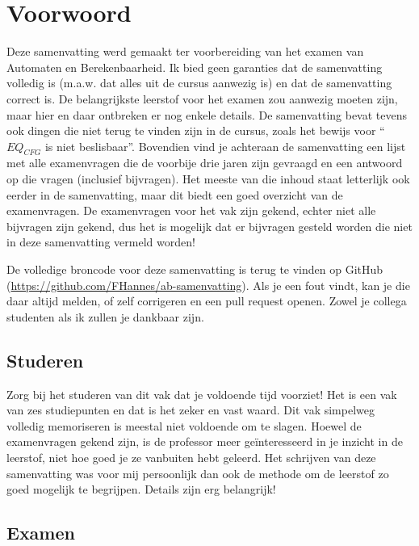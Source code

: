 \documentclass[a4paper]{article}
\begin{document}
\tableofcontents

\newpage

\section{Voorwoord}

Deze samenvatting werd gemaakt ter voorbereiding van het examen van Automaten en Berekenbaarheid. Ik bied geen garanties dat de samenvatting volledig is (m.a.w. dat alles uit de cursus aanwezig is) en dat de samenvatting correct is. De belangrijkste leerstof voor het examen zou aanwezig moeten zijn, maar hier en daar ontbreken er nog enkele details. De samenvatting bevat tevens ook dingen die niet terug te vinden zijn in de cursus, zoals het bewijs voor ``$EQ_{CFG}$ is niet beslisbaar''. Bovendien vind je achteraan de samenvatting een lijst met alle examenvragen die de voorbije drie jaren zijn gevraagd en een antwoord op die vragen (inclusief bijvragen). Het meeste van die inhoud staat letterlijk ook eerder in de samenvatting, maar dit biedt een goed overzicht van de examenvragen. De examenvragen voor het vak zijn gekend, echter niet alle bijvragen zijn gekend, dus het is mogelijk dat er bijvragen gesteld worden die niet in deze samenvatting vermeld worden!

De volledige broncode voor deze samenvatting is terug te vinden op GitHub (\url{https://github.com/FHannes/ab-samenvatting}). Als je een fout vindt, kan je die daar altijd melden, of zelf corrigeren en een pull request openen. Zowel je collega studenten als ik zullen je dankbaar zijn.

\subsection{Studeren}

Zorg bij het studeren van dit vak dat je voldoende tijd voorziet! Het is een vak van zes studiepunten en dat is het zeker en vast waard. Dit vak simpelweg volledig memoriseren is meestal niet voldoende om te slagen. Hoewel de examenvragen gekend zijn, is de professor meer ge\"interesseerd in je inzicht in de leerstof, niet hoe goed je ze vanbuiten hebt geleerd. Het schrijven van deze samenvatting was voor mij persoonlijk dan ook de methode om de leerstof zo goed mogelijk te begrijpen. Details zijn erg belangrijk!

\subsection{Examen}
\end{document}
